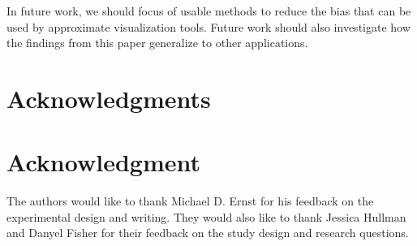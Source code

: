 \documentclass[10pt,journal,compsoc]{IEEEtran}
\begin{document}
In future work, we should focus of usable methods to reduce the bias that can be used by approximate visualization tools.
Future work should also investigate how the findings from this paper generalize to other applications.

\ifCLASSOPTIONcompsoc
  \section*{Acknowledgments}
\else
  \section*{Acknowledgment}
\fi


The authors would like to thank Michael D. Ernst for his feedback on the experimental design and writing.
They would also like to thank Jessica Hullman and Danyel Fisher for their feedback on the study design and research questions.

\ifCLASSOPTIONcaptionsoff
  \newpage
\fi







%

\end{document}
